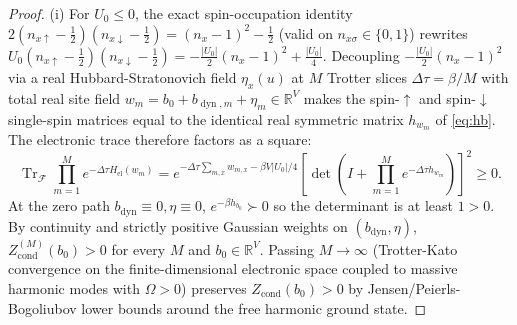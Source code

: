 \documentclass[11pt]{article}
\theoremstyle{definition}
\theoremstyle{remark}
\DeclareMathOperator{\Tr}{Tr}
\DeclareMathOperator{\cond}{cond}
\DeclareMathOperator{\dyn}{dyn}
\DeclareMathOperator{\el}{el}
\newcommand{\R}{\mathbb{R}}
\begin{document}
\begin{proof}
(i) For $U_0 \le 0$, the exact spin-occupation identity $2(n_{x\uparrow}-\frac{1}{2})(n_{x\downarrow}-\frac{1}{2}) = (n_x - 1)^2 - \frac{1}{2}$ (valid on $n_{x\sigma}\in\{0,1\}$) rewrites $U_0(n_{x\uparrow}-\frac{1}{2})(n_{x\downarrow}-\frac{1}{2}) = -\frac{|U_0|}{2}(n_x - 1)^2 + \frac{|U_0|}{4}$. Decoupling $-\frac{|U_0|}{2}(n_x - 1)^2$ via a real Hubbard-Stratonovich field $\eta_x(u)$ at $M$ Trotter slices $\Delta\tau = \beta/M$ with total real site field $w_m = b_0 + b_{\dyn,m} + \eta_m \in \R^V$ makes the spin-$\uparrow$ and spin-$\downarrow$ single-spin matrices equal to the identical real symmetric matrix $h_{w_m}$ of \eqref{eq:hb}. The electronic trace therefore factors as a square:
\[
\Tr_{\mathcal{F}} \prod_{m=1}^M e^{-\Delta\tau H_{\el}(w_m)} = e^{-\Delta\tau \sum_{m,x} w_{m,x} - \beta V |U_0|/4} \left[\det\!\left(I + \prod_{m=1}^M e^{-\Delta\tau h_{w_m}}\right)\right]^2 \ge 0.
\]
At the zero path $b_{\dyn} \equiv 0, \eta \equiv 0$, $e^{-\beta h_{b_0}} \succ 0$ so the determinant is at least $1 > 0$. By continuity and strictly positive Gaussian weights on $(b_{\dyn}, \eta)$, $Z_{\cond}^{(M)}(b_0) > 0$ for every $M$ and $b_0 \in \R^V$. Passing $M \to \infty$ (Trotter-Kato convergence on the finite-dimensional electronic space coupled to massive harmonic modes with $\Omega > 0$) preserves $Z_{\cond}(b_0) > 0$ by Jensen/Peierls-Bogoliubov lower bounds around the free harmonic ground state.


\end{proof}
\end{document}
